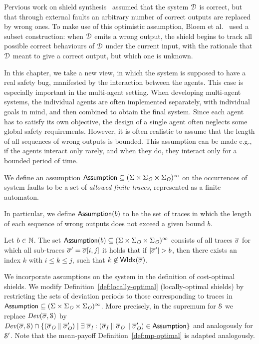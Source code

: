 Pervious work on shield synthesis~\cite{KonighoferABHKT17,BloemKKW15} assumed that the system $\mathcal{D}$ is correct,
but that through external faults an arbitrary number of correct outputs are replaced by wrong ones. To make use of this optimistic assumption, Bloem et al.~\cite{BloemKKW15}
used a subset construction:  when $\mathcal{D}$ emits a wrong output, the shield begins to track all possible correct behaviours of $\mathcal{D}$ under the current input, with the rationale that $\mathcal{D}$ meant to give a correct output, but which one is unknown.

In this chapter, we take a new view, in which the system is supposed to have a real safety bug, manifested by the interaction between the agents. This case is especially important in the multi-agent  setting.
When developing multi-agent systems, the individual agents are often implemented separately, with individual goals in mind, and then combined to obtain the final system. Since each agent has to satisfy its own objective, the design of a single agent often neglects some global safety requirements.
However, it is often realistic to assume that the length of all sequences of wrong outputs is bounded. This assumption can be made e.g., if the agents  interact only rarely, and when they do,  they interact only for a bounded period of time.

We define an assumption $\mathsf{Assumption}\subseteq (\Sigma \times \Sigma_{\textit{O}} \times \Sigma_{\textit{O}})^\infty$ on the occurrences of system faults
to be a set of \emph{allowed finite traces}, represented as a finite automaton.

In particular, we define $\mathsf{Assumption}(b)$ to be the set of traces in which the length of each sequence of wrong outputs does not exceed a given bound $b$.
\begin{defn}
Let  $b\in\mathbb{N}$. The set $\mathsf{Assumption}(b)\subseteq (\Sigma \times \Sigma_{\textit{O}} \times \Sigma_{\textit{O}})^\infty$ consists of all traces $\overline\sigma$ for which all sub-traces $\overline\sigma' = \overline\sigma[i,j]$ it holds that if $|\overline\sigma'| > b$, then there exists an index $k$ with $i \leq k \leq j$, such that $k \not \in \mathsf{WIdx}(\overline\sigma)$.
\end{defn}

We incorporate assumptions on the system in the definition of cost-optimal shields.
We modify Definition~\ref{def:locally-optimal} (locally-optimal shields) by restricting the sets of deviation periods to those corresponding to traces in $\mathsf{Assumption} \subseteq (\Sigma \times \Sigma_{\textit{O}} \times \Sigma_{\textit{O}})^\infty$. More precisely, in the supremum  for $\mathcal{S}$ we replace $\mathit{Dev}(\overline\sigma,\mathcal{S})$ by $\mathit{Dev}(\overline\sigma,\mathcal{S}) \cap \{(\overline\sigma_{\textit{O}}\parallel\overline\sigma_{\textit{O}}')\mid \exists\; \overline\sigma_{\textit{I}}: (\overline\sigma_{\textit{I}}\parallel\overline\sigma_{\textit{O}}\parallel\overline\sigma_{\textit{O}}')\in \mathsf{Assumption}\}$ and analogously for $\mathcal{S}'$. 
\iftrue Note that the mean-payoff
Definition~\ref{def:mp-optimal} is adapted analogously.
\fi

